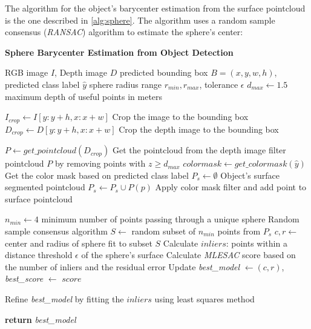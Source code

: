The algorithm for the object's barycenter estimation from the surface pointcloud is the one described
in \ref{alg:sphere}. The algorithm uses a random sample consensus (\textit{RANSAC}) algorithm to estimate the sphere's center:

\begin{algorithm}[h]
    \caption{\textbf{Sphere Barycenter Estimation from Object Detection}}
    \label{alg:sphere}
    \begin{algorithmic}[1]
    \Require RGB image $I$, Depth image $D$
    \Require predicted bounding box $B = (x, y, w, h)$, predicted class label $\hat{y}$
    \State sphere radius range $r_{min}, r_{max}$, tolerance $\epsilon$
    \State $d_{max} \gets 1.5$ \Comment maximum depth of useful points in meters

    \State $I_{crop} \gets I[y:y+h, x:x+w]$ \Comment Crop the image to the bounding box
    \State $D_{crop} \gets D[y:y+h, x:x+w]$ \Comment Crop the depth image to the bounding box

    \State $P \gets \textit{get\_pointcloud}(D_{crop})$ \Comment Get the pointcloud from the depth image
    \State filter pointcloud $P$ by removing points with $z \geq d_{max}$
    \State $colormask \gets \textit{get\_colormask}(\hat{y})$ \Comment Get the color mask based on predicted class label
    \State $P_{s} \gets \emptyset$ \Comment Object's surface segmented pointcloud
            \State $P_{s} \gets P_{s} \cup P(p)$ \Comment Apply color mask filter and add point to surface pointcloud
        \EndIf
    \EndFor

    \State $n_{min} \gets 4$ \Comment minimum number of points passing through a unique sphere
     \Comment Random sample consensus algorithm
        \State $S \gets$ random subset of $n_{min}$ points from $P_s$  
        \State $c, r \gets$ center and radius of sphere fit to subset $S$
            \State Calculate $inliers$: points within a distance threshold $\epsilon$ of the sphere's surface
            \State Calculate \textit{MLESAC} score based on the number of inliers and the residual error
                \State Update \textit{best\_model} $\gets (c, r)$, \textit{best\_score} $\gets$ $score$
            \EndIf
        \EndIf
    \EndFor

    \State Refine \textit{best\_model} by fitting the $inliers$ using least squares method

    \State \textbf{return} \textit{best\_model}

    \end{algorithmic}
\end{algorithm}

